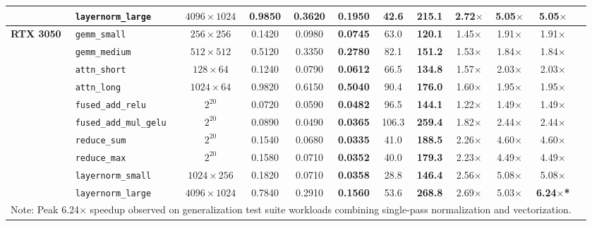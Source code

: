 \documentclass[10pt,journal,compsoc]{IEEEtran}
\begin{document}
\begin{table}[htbp]
{\begin{tabular}{llcccccccccc}
 & \texttt{layernorm\_large} & $4096 \times 1024$ & 0.9850 & 0.3620 & \textbf{0.1950} & 42.6 & \textbf{215.1} & 2.72$\times$ & 5.05$\times$ & 5.05$\times$ \\
\midrule
\multirow{10}{*}{\textbf{RTX 3050}}
 & \texttt{gemm\_small} & $256 \times 256$ & 0.1420 & 0.0980 & \textbf{0.0745} & 63.0 & \textbf{120.1} & 1.45$\times$ & 1.91$\times$ & 1.91$\times$ \\
 & \texttt{gemm\_medium} & $512 \times 512$ & 0.5120 & 0.3350 & \textbf{0.2780} & 82.1 & \textbf{151.2} & 1.53$\times$ & 1.84$\times$ & 1.84$\times$ \\
 & \texttt{attn\_short} & $128 \times 64$ & 0.1240 & 0.0790 & \textbf{0.0612} & 66.5 & \textbf{134.8} & 1.57$\times$ & 2.03$\times$ & 2.03$\times$ \\
 & \texttt{attn\_long} & $1024 \times 64$ & 0.9820 & 0.6150 & \textbf{0.5040} & 90.4 & \textbf{176.0} & 1.60$\times$ & 1.95$\times$ & 1.95$\times$ \\
 & \texttt{fused\_add\_relu} & $2^{20}$ & 0.0720 & 0.0590 & \textbf{0.0482} & 96.5 & \textbf{144.1} & 1.22$\times$ & 1.49$\times$ & 1.49$\times$ \\
 & \texttt{fused\_add\_mul\_gelu} & $2^{20}$ & 0.0890 & 0.0490 & \textbf{0.0365} & 106.3 & \textbf{259.4} & 1.82$\times$ & 2.44$\times$ & 2.44$\times$ \\
 & \texttt{reduce\_sum} & $2^{20}$ & 0.1540 & 0.0680 & \textbf{0.0335} & 41.0 & \textbf{188.5} & 2.26$\times$ & 4.60$\times$ & 4.60$\times$ \\
 & \texttt{reduce\_max} & $2^{20}$ & 0.1580 & 0.0710 & \textbf{0.0352} & 40.0 & \textbf{179.3} & 2.23$\times$ & 4.49$\times$ & 4.49$\times$ \\
 & \texttt{layernorm\_small} & $1024 \times 256$ & 0.1820 & 0.0710 & \textbf{0.0358} & 28.8 & \textbf{146.4} & 2.56$\times$ & 5.08$\times$ & 5.08$\times$ \\
 & \texttt{layernorm\_large} & $4096 \times 1024$ & 0.7840 & 0.2910 & \textbf{0.1560} & 53.6 & \textbf{268.8} & 2.69$\times$ & 5.03$\times$ & \textbf{6.24$\times$*} \\
\bottomrule
\multicolumn{11}{p{0.98\linewidth}}{\footnotesize *Note: Peak 6.24$\times$ speedup observed on generalization test suite workloads combining single-pass normalization and vectorization.}
\end{tabular}%
}
\end{table}
\end{document}
